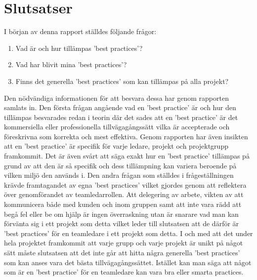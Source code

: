 \section{Slutsatser}
I början av denna rapport ställdes följande frågor:
\begin{enumerate}
		\item Vad är och hur tillämpas 'best practices'?
		\item Vad har blivit mina 'best practices'?
		\item Finns det generella 'best practices' som kan tillämpas på alla projekt?
\end{enumerate}
Den nödvändiga informationen för att besvara dessa har genom rapporten samlats in. Den första frågan angående vad en 'best practice' är och hur den tillämpas besvarades redan i teorin där det sades att en 'best practice' är det kommersiella eller professionella tillvägagångssätt vilka är accepterade och föreskrivna som korrekta och mest effektiva. Genom rapporten har även insikten att en 'best practice' är specifik för varje ledare, projekt och projektgrupp framkommit. Det är även svårt att säga exakt hur en 'best practice' tillämpas på grund av att den är så specifik och dess tillämpning kan variera beroende på vilken miljö den används i. 
\newline \newline 
Den andra frågan som ställdes i frågeställningen krävde framtagandet av egna 'best practices' vilket gjordes genom att reflektera över genomförandet av teamledarrollen. Att delegering av arbete, vikten av att kommunicera både med kunden och inom gruppen samt att inte vara rädd att begå fel eller be om hjälp är ingen överraskning utan är snarare vad man kan förvänta sig i ett projekt som detta vilket leder till slutsatsen att de därför är 'best practices' för en teamledare i ett projekt som detta.
\newline \newline
I och med att det under hela projektet framkommit att varje grupp och varje projekt är unikt på något sätt måste slutsatsen att det inte går att hitta några generella 'best practices' som kan anses vara det bästa tillvägagångssättet. Istället kan man säga att något som är en 'best practice' för en teamledare kan vara bra eller smarta practices.